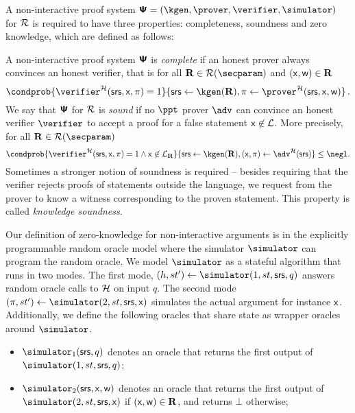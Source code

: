 A non-interactive  proof system $\proofsystem = (\kgen, \prover, \verifier, \simulator)$ for $\mathcal{R}$ is
required to have three properties: completeness, soundness and zero knowledge, which are
defined as follows:

  A non-interactive proof system $\bm{\mathsf{\Psi}}$ is
  \emph{complete} if an honest prover always convinces an honest verifier, that
  is for all $\REL \in \RELGEN(\secparam)$ and $(\mathsf{x}, \mathsf{w}) \in \mathbf{R}$
	\[
		\condprob{\verifier^\ro (\srs, \inp, \zkproof) = 1} {\srs \gets \kgen(\REL),
      \zkproof \gets \prover^\ro (\srs, \inp, \wit)}\,.
	\]
    We say that $\bm{\mathsf{\Psi}}$ for $\mathcal{R}$ is \emph{sound} if no
  $\ppt$ prover $\adv$ can convince an honest verifier $\verifier$ to accept a
  proof for a false statement $\mathsf{x} \not\in\mathcal{L}$. More precisely, for
  all $\REL \in \RELGEN(\secparam)$
	\[
    \condprob{ \verifier^\ro (\srs, \inp, \zkproof) = 1 \land \inp \not\in
      \LANG_\REL}{\srs \gets \kgen(\REL), (\inp, \zkproof) \gets \adv^\ro(\srs)} \leq
    \negl.
	\]
Sometimes a stronger notion of soundness is required -- besides requiring that the
verifier rejects proofs of statements outside the language, we request from the
prover to know a witness corresponding to the proven statement. This property is
called \emph{knowledge soundness}.%
 
  Our definition of zero-knowledge for non-interactive
arguments is in the explicitly programmable random oracle model where the simulator
$\simulator$ can program the random oracle. We model $\simulator$ as a stateful
algorithm that runs in two modes. The first mode,
$(h, st') \gets \simulator (1, st, \srs, q)$ answers random oracle calls to $\mathcal{H}$ on input
$q$. The second mode $(\zkproof, st') \gets \simulator (2, st, \srs, \inp)$ simulates the
actual argument for instance $\mathsf{x}$.  Additionally, we define the
following oracles that share state as wrapper oracles around $\simulator$.
\begin{itemize}
\item $\simulator_1 (\srs,q)$ denotes an oracle that returns the first output of
  $\simulator (1, st, \srs, q)$;
\item $\simulator_2 (\srs,\inp, \wit)$ denotes an oracle that returns the first output of
  $\simulator (2, st, \srs, \inp)$ if $(\mathsf{x}, \mathsf{w}) \in \mathbf{R}$, and returns $\bot$ otherwise;
\end{itemize}

